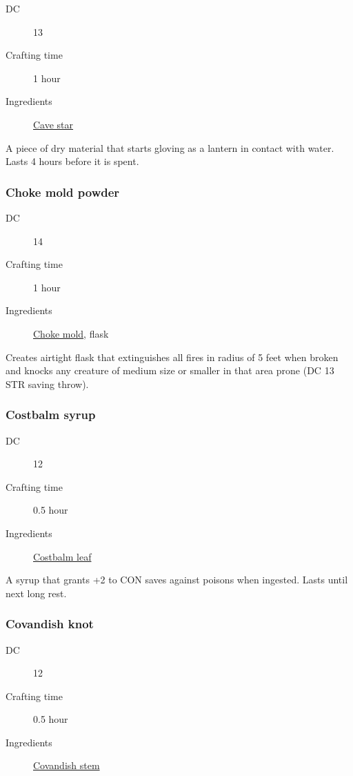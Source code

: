 \begin{description}
\item [DC] 13
\item [Crafting time] 1 hour
\item [Ingredients] \hyperref[Cave star]{Cave star}
\end{description}

A piece of dry material that starts gloving as a lantern in contact with water. Lasts 4 hours before it is spent.

\subsubsection{Choke mold powder}
\label{Choke mold powder}

\begin{description}
\item [DC] 14
\item [Crafting time] 1 hour
\item [Ingredients] \hyperref[Choke Mold]{Choke mold}, flask
\end{description}

Creates airtight flask that extinguishes all fires in radius of 5 feet when broken and knocks any creature of medium size or smaller in that area prone (DC 13 STR saving throw).

\subsubsection{Costbalm syrup}
\label{Costbalm syrup}

\begin{description}
\item [DC] 12
\item [Crafting time] 0.5 hour
\item [Ingredients] \hyperref[Cotsbalm]{Costbalm leaf}
\end{description}

A syrup that grants +2 to CON saves against poisons when ingested. Lasts until next long rest.

\subsubsection{Covandish knot}
\label{Covandish knot}

\begin{description}
\item [DC] 12
\item [Crafting time] 0.5 hour
\item [Ingredients] \hyperref[Covadish]{Covandish stem}
\end{description}

